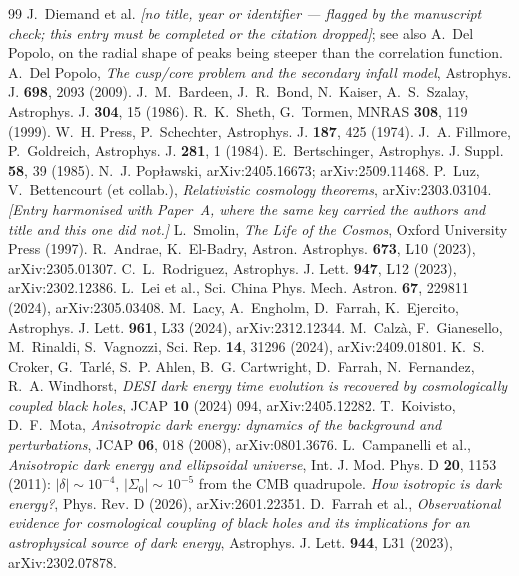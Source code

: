 \documentclass[11pt]{article}
\begin{document}
\begin{thebibliography}{99}
 J.~Diemand et al. \emph{[no title, year or identifier --- flagged by the manuscript check; this entry must be completed or the citation dropped]}; see also A.~Del Popolo, on the radial shape of peaks being steeper than the correlation function.
 A.~Del Popolo, \emph{The cusp/core problem and the secondary infall model}, Astrophys. J. \textbf{698}, 2093 (2009).
 J.~M.~Bardeen, J.~R.~Bond, N.~Kaiser, A.~S.~Szalay, Astrophys. J. \textbf{304}, 15 (1986).
 R.~K.~Sheth, G.~Tormen, MNRAS \textbf{308}, 119 (1999).
 W.~H. Press, P.~Schechter, Astrophys. J. \textbf{187}, 425 (1974).
 J.~A. Fillmore, P.~Goldreich, Astrophys. J. \textbf{281}, 1 (1984).
 E.~Bertschinger, Astrophys. J. Suppl. \textbf{58}, 39 (1985).
 N.~J. Pop{\l}awski, arXiv:2405.16673; arXiv:2509.11468.
 P.~Luz, V.~Bettencourt (et collab.), \emph{Relativistic cosmology theorems}, arXiv:2303.03104. \emph{[Entry harmonised with Paper~A, where the same key carried the authors and title and this one did not.]}
 L.~Smolin, \emph{The Life of the Cosmos}, Oxford University Press (1997).
 R.~Andrae, K.~El-Badry, Astron. Astrophys. \textbf{673}, L10 (2023), arXiv:2305.01307.
 C.~L.~Rodriguez, Astrophys. J. Lett. \textbf{947}, L12 (2023), arXiv:2302.12386.
 L.~Lei et al., Sci. China Phys. Mech. Astron. \textbf{67}, 229811 (2024), arXiv:2305.03408.
 M.~Lacy, A.~Engholm, D.~Farrah, K.~Ejercito, Astrophys. J. Lett. \textbf{961}, L33 (2024), arXiv:2312.12344.
 M.~Calz\`a, F.~Gianesello, M.~Rinaldi, S.~Vagnozzi, Sci. Rep. \textbf{14}, 31296 (2024), arXiv:2409.01801.
 K.~S. Croker, G.~Tarl\'e, S.~P. Ahlen, B.~G. Cartwright, D.~Farrah, N.~Fernandez, R.~A. Windhorst, \emph{DESI dark energy time evolution is recovered by cosmologically coupled black holes}, JCAP \textbf{10} (2024) 094, arXiv:2405.12282.
 T.~Koivisto, D.~F.~Mota, \emph{Anisotropic dark energy: dynamics of the background and perturbations}, JCAP \textbf{06}, 018 (2008), arXiv:0801.3676.
 L.~Campanelli et al., \emph{Anisotropic dark energy and ellipsoidal universe}, Int. J. Mod. Phys. D \textbf{20}, 1153 (2011): $|\delta| \sim 10^{-4}$, $|\Sigma_0| \sim 10^{-5}$ from the CMB quadrupole.
 \emph{How isotropic is dark energy?}, Phys. Rev. D (2026), arXiv:2601.22351.
 D.~Farrah et al., \emph{Observational evidence for cosmological coupling of black holes and its implications for an astrophysical source of dark energy}, Astrophys. J. Lett. \textbf{944}, L31 (2023), arXiv:2302.07878.
\end{thebibliography}
\end{document}
